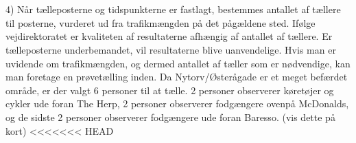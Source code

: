 ~\\\\
4) Når tælleposterne og tidspunkterne er fastlagt, bestemmes antallet af tællere til posterne, vurderet ud fra trafikmængden på det pågældene sted. Ifølge vejdirektoratet er kvaliteten af resultaterne afhængig af antallet af tællere. Er tælleposterne underbemandet, vil resultaterne blive uanvendelige. Hvis man er uvidende om trafikmængden, og dermed antallet af tæller som er nødvendige, kan man foretage en prøvetælling inden. Da Nytorv/Østerågade er et meget befærdet område, er der valgt 6 personer til at tælle. 2 personer observerer køretøjer og cykler ude foran The Herp, 2 personer observerer fodgængere ovenpå McDonalds, og de sidste 2 personer observerer fodgængere ude foran Baresso. (vis dette på kort)
<<<<<<< HEAD


